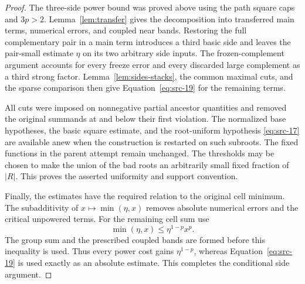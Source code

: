 \begin{proof}
The three-side power bound was proved above using the path square
caps and $3p>2$.  Lemma~\ref{lem:transfer} gives the decomposition
into transferred main terms, numerical errors, and coupled near
bands.  Restoring the full complementary pair in a main term
introduces a third basic side and leaves the pair-small estimate
$\eta$ on its two arbitrary side inputs.  The frozen-complement
argument accounts for every freeze error and every discarded large
complement as a third strong factor.  Lemma~\ref{lem:sides-stacks},
the common maximal cuts, and the sparse comparison then give
Equation~\eqref{eq:src-19} for the remaining terms.

All cuts were imposed on nonnegative partial ancestor quantities
and removed the original summands at and below their first
violation.  The normalized base hypotheses, the basic square
estimate, and the root-uniform hypothesis \eqref{eq:src-17} are
available anew when the construction is restarted on such subroots.
The fixed functions in the parent attempt remain unchanged.
The thresholds may be chosen to make
the union of the bad roots an arbitrarily small fixed fraction
of $|R|$.  This proves the asserted uniformity and support
convention.

Finally, the estimates have the required relation to the original
cell minimum.  The subadditivity of $x\mapsto\min(\eta,x)$ removes
absolute numerical errors and the critical unpowered terms.  For
the remaining cell sum use
\[
 \min(\eta,x)\le\eta^{1-p}x^p.
\]
The group sum and the prescribed coupled bands are formed before
this inequality is used.  Thus every power cost gains
$\eta^{1-p}$, whereas Equation~\eqref{eq:src-19} is used exactly
as an absolute estimate.  This completes the conditional side
argument.
\end{proof}
